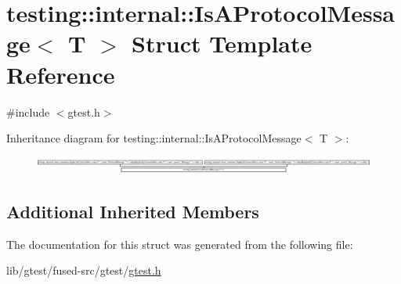 \hypertarget{structtesting_1_1internal_1_1_is_a_protocol_message}{\section{testing\-:\-:internal\-:\-:Is\-A\-Protocol\-Message$<$ T $>$ Struct Template Reference}
\label{structtesting_1_1internal_1_1_is_a_protocol_message}
}


{\ttfamily \#include $<$gtest.\-h$>$}

Inheritance diagram for testing\-:\-:internal\-:\-:Is\-A\-Protocol\-Message$<$ T $>$\-:\begin{figure}[H]
\begin{center}
\leavevmode
\includegraphics[height=0.566229cm]{structtesting_1_1internal_1_1_is_a_protocol_message}
\end{center}
\end{figure}
\subsection*{Additional Inherited Members}


The documentation for this struct was generated from the following file\-:\begin{DoxyCompactItemize}
\item 
lib/gtest/fused-\/src/gtest/\hyperlink{fused-src_2gtest_2gtest_8h}{gtest.\-h}\end{DoxyCompactItemize}
